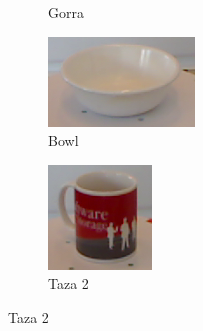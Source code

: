 \begin{figure}
\begin{subfigure}[b]{0.4\textwidth}
        \caption{Gorra}
		\label{fig:gorra}
    \end{subfigure}

    \quad
    \begin{subfigure}[b]{0.4\textwidth}
        \includegraphics[width=\textwidth]{img/base_rgbd/bowl.png}
        \caption{Bowl}
		\label{fig:bowl}
    \end{subfigure}
	\quad
    \begin{subfigure}[b]{0.4\textwidth}
        \includegraphics[width=\textwidth]{img/base_rgbd/taza2.png}
        \caption{Taza 2}
		\label{fig:taza2}
    \end{subfigure}


\end{figure}
